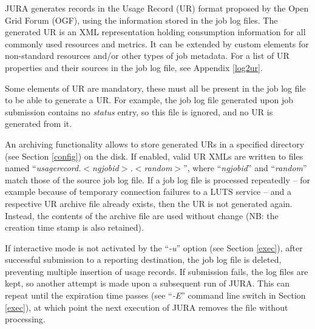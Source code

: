 \documentclass{article}                            %
\begin{document}


JURA generates records in the Usage Record (UR) format\cite{ur}
proposed by the Open Grid Forum (OGF), using the information stored in
the job log files. The generated UR is an XML representation holding
consumption information for all commonly used resources and
metrics. It can be extended by custom elements for non-standard
resources and/or other types of job metadata. For a list of UR
properties and their sources in the job log file, see Appendix
\ref{log2ur}.

Some elements of UR are mandatory, these must all be present in the
job log file to be able to generate a UR. For example, the job log
file generated upon job submission contains no \textit{status} entry,
so this file is ignored, and no UR is generated from it.

An archiving functionality allows to store generated URs in a
specified directory (see Section \ref{config}) on the disk. If
enabled, valid UR XMLs are written to files named
``\textit{usagerecord.$<$ngjobid$>$.$<$random$>$}'', where
``\textit{ngjobid}'' and ``\textit{random}'' match those of the source
job log file. If a job log file is processed repeatedly -- for example
because of temporary connection failures to a LUTS service -- and a
respective UR archive file already exists, then the UR is not
generated again. Instead, the contents of the archive file are used
without change (NB: the creation time stamp is also retained).

If interactive mode is not activated by the ``\textit{-u}'' option
(see Section \ref{exec}),
after successful submission to a reporting destination, the job log
file is deleted, preventing multiple insertion of usage records. If
submission fails, the log files are kept, so another attempt is made
upon a subsequent run of JURA. This can repeat until the expiration
time passes (see ``\textit{-E}'' command line switch in Section
\ref{exec}), at which point the next execution of JURA removes the
file without processing.
\end{document}
